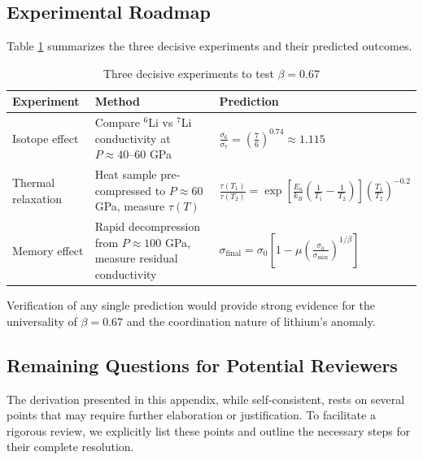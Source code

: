 \documentclass[12pt,a4paper]{article}
\theoremstyle{remark}
\begin{document}
	\subsection{Experimental Roadmap}
	
	Table \ref{tab:experiments} summarizes the three decisive experiments and their predicted outcomes.
	
	\begin{table}[h]
		\centering
		\caption{Three decisive experiments to test \(\beta = 0.67\)}
		\label{tab:experiments}
		\begin{tabular}{p{}p{}p{}}
			\toprule
			\textbf{Experiment} & \textbf{Method} & \textbf{Prediction} \\
			\midrule
			Isotope effect & Compare \(^6\)Li vs \(^7\)Li conductivity at \(P \approx 40\)–60 GPa & \(\displaystyle \frac{\sigma_6}{\sigma_7} = \left(\frac{7}{6}\right)^{0.74} \approx 1.115\) \\
			\hline
			Thermal relaxation & Heat sample pre-compressed to \(P \approx 60\) GPa, measure \(\tau(T)\) & \(\displaystyle \frac{\tau(T_1)}{\tau(T_2)} = \exp\left[\frac{E_a}{k_B}\left(\frac1{T_1}-\frac1{T_2}\right)\right] \left(\frac{T_1}{T_2}\right)^{-0.2}\) \\
			\hline
			Memory effect & Rapid decompression from \(P \approx 100\) GPa, measure residual conductivity & \(\displaystyle \sigma_{\text{final}} = \sigma_0\left[1 - \mu\left(\frac{\sigma_0}{\sigma_{\max}}\right)^{1/\beta}\right]\) \\
			\bottomrule
		\end{tabular}
	\end{table}
	
	Verification of any single prediction would provide strong evidence for the universality of \(\beta = 0.67\) and the coordination nature of lithium's anomaly.
	
	\subsection{Remaining Questions for Potential Reviewers}
	\label{subsec:remaining-questions}
	
	The derivation presented in this appendix, while self-consistent, rests on several points that may require further elaboration or justification. To facilitate a rigorous review, we explicitly list these points and outline the necessary steps for their complete resolution.
	
\end{document}
